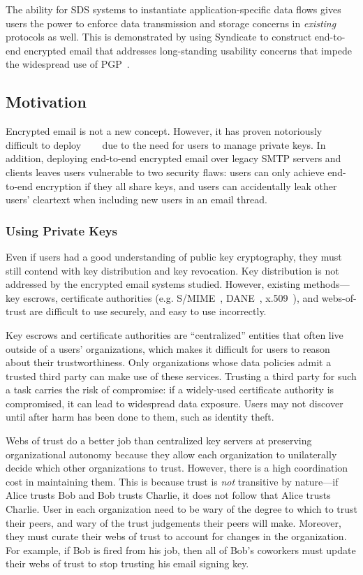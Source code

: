 The ability for SDS systems to instantiate application-specific data flows gives
users the power to enforce data transmission and storage concerns in
\emph{existing} protocols as well.  This is demonstrated by using Syndicate to construct
end-to-end encrypted email that addresses long-standing
usability concerns that impede the widespread use of PGP~\cite{pgp}.

\subsection{Motivation}

Encrypted email is not a new concept.  However, it has proven notoriously difficult to
deploy~\cite{why-jonny-cant-encrypt}~\cite{why-jonny-still-cant-encrypt}
~\cite{why-jonny-still-still-cant-encrypt} due to the need for users to manage
private keys.  In addition, deploying end-to-end encrypted email over legacy
SMTP servers and clients leaves users vulnerable to two security flaws:  users
can only achieve end-to-end encryption if they all share keys, and users can
accidentally leak other users' cleartext when including new users in an email
thread.

\subsubsection{Using Private Keys}

Even if users had a good understanding of public key cryptography, they must still contend
with key distribution and key revocation.  Key distribution is not addressed by
the encrypted email systems studied.  However, existing methods---key escrows,
certificate authorities (e.g. S/MIME~\cite{smime}, DANE~\cite{dane},
x.509~\cite{x509}), and webs-of-trust are difficult to use securely, and easy to
use incorrectly.

Key escrows and certificate authorities are ``centralized''
entities that often live outside of a users' organizations, which makes it
difficult for users to reason about their trustworthiness.  Only organizations
whose data policies admit a trusted third party can make use of these services.
Trusting a third party for such a task carries the risk of compromise: if a
widely-used certificate authority is compromised, it can lead to widespread
data exposure.  Users may not discover until after harm has been done to
them, such as identity theft.

Webs of trust do a better job than centralized key servers at preserving
organizational autonomy because they allow each organization to unilaterally
decide which other organizations to trust.  However, there is a high
coordination cost in maintaining them.  This
is because trust is \emph{not} transitive by nature---if Alice trusts Bob and Bob
trusts Charlie, it does not follow that Alice trusts Charlie.  User in each
organization need to be wary of the degree to which to trust their peers, and wary of the trust
judgements their peers will make.  Moreover, they must curate their webs of
trust to account for changes in the organization.  For example, if Bob is fired
from his job, then all of Bob's coworkers must update their webs of trust to stop trusting his
email signing key.

